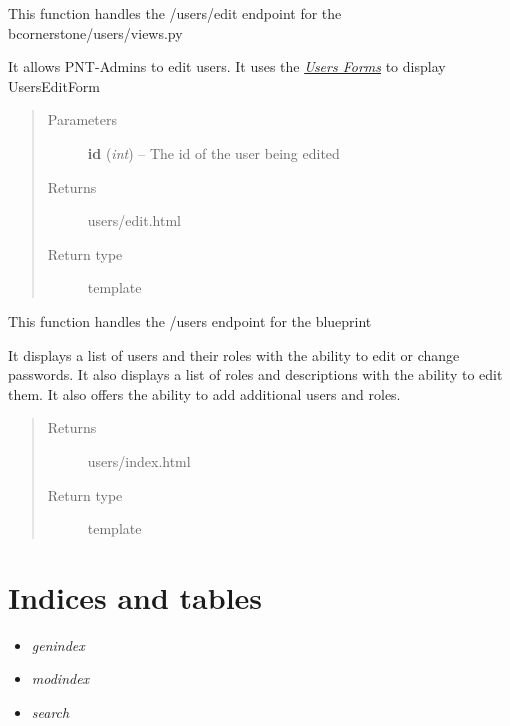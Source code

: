 \documentclass[letterpaper,10pt,english]{sphinxmanual}
\begin{document}
\begin{fulllineitems}
\label{dev-users:cagenix.users.views.users_edit}
This function handles the /users/edit endpoint for the bcornerstone/users/views.py

It allows PNT-Admins to edit users.  It uses the {\hyperref[dev-users:users-forms-label]{\emph{Users Forms}}}
to display UsersEditForm
\begin{quote}\begin{description}
\item[{Parameters}] \leavevmode
\textbf{id} (\emph{int}) -- The id of the user being edited

\item[{Returns}] \leavevmode
users/edit.html

\item[{Return type}] \leavevmode
template

\end{description}\end{quote}

\end{fulllineitems}


\begin{fulllineitems}
\label{dev-users:cagenix.users.views.users_home}
This function handles the /users endpoint for the blueprint

It displays a list of users and their roles with the ability to edit or
change passwords. It also displays a list of roles and descriptions with
the ability to edit them.  It also offers the ability to add additional
users and roles.
\begin{quote}\begin{description}
\item[{Returns}] \leavevmode
users/index.html

\item[{Return type}] \leavevmode
template

\end{description}\end{quote}

\end{fulllineitems}



\chapter{Indices and tables}
\label{index:indices-and-tables}\begin{itemize}
\item {} 
\emph{genindex}

\item {} 
\emph{modindex}

\item {} 
\emph{search}

\end{itemize}
\end{document}
